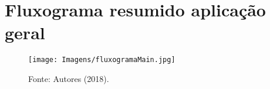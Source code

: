  \chapter{Fluxograma resumido aplicação geral}
 \label{app:fluxoMain}
 \begin{figure}[H]
    \centering
        \texttt{[image: Imagens/fluxogramaMain.jpg]}
        \caption*{Fonte: Autores (2018).}
\end{figure}
 
